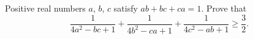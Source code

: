 Positive real numbers $a$, $b$, $c$ satisfy $ab+bc+ca=1$. Prove that
\[
\dfrac{1}{4a^2-bc+1}+\dfrac{1}{4b^2-ca+1}+\dfrac{1}{4c^2-ab+1}\ge\dfrac{3}{2} .
\]
